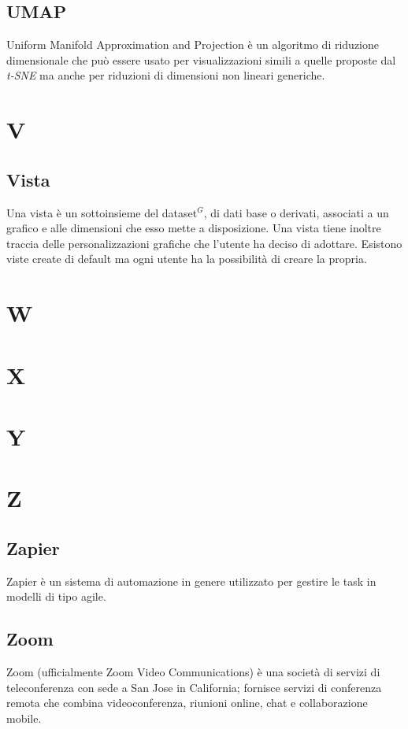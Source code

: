\subsection{UMAP}
Uniform Manifold Approximation and Projection è un algoritmo di riduzione dimensionale che può essere usato per visualizzazioni simili a quelle proposte dal \textit{t-SNE} ma anche per  riduzioni di dimensioni non lineari generiche.

\newpage
\section{V}
\subsection{Vista}
Una vista è un sottoinsieme del dataset$^{G}$, di dati base o derivati, associati a un grafico e alle dimensioni che esso mette a disposizione. Una vista tiene inoltre traccia delle personalizzazioni grafiche che l'utente ha deciso di adottare. Esistono viste create di default ma ogni utente ha la possibilità di creare la propria.

\newpage
\section{W}

\newpage
\section{X}

\newpage
\section{Y}

\newpage
\section{Z}
\subsection{Zapier}
Zapier è un sistema di automazione in genere utilizzato per gestire le task in modelli di tipo agile.

\subsection{Zoom}
Zoom (ufficialmente Zoom Video Communications) è una società di servizi di teleconferenza con sede a San Jose in California; fornisce servizi di conferenza remota che combina videoconferenza, riunioni online, chat e collaborazione mobile.